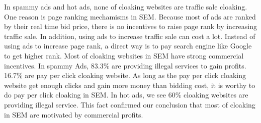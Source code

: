 In spammy ads and hot ads, none of cloaking websites are traffic sale cloaking. 
One reason is page ranking mechamisms in SEM.
Because most of ads are ranked by their real time bid price,
there is no incentives to raise page rank by increasing traffic sale.
In addition, using ads to increase traffic sale can cost a lot.
Instead of using ads to increase page rank, a direct way
is to pay search engine like Google to get higher rank. 
Most of cloaking websites in SEM have strong commercial incentives. In spammy Ads,
83.3\% are providing illegal services to gain profits. 
16.7\% are pay per click cloaking website. As long as the pay per click cloaking 
website get enough clicks and gain more money than bidding cost,
it is worthy to do pay per click cloaking in SEM. In hot ads, we see 60\%
cloaking websites are providing illegal service.
This fact confirmed our conclusion that most of cloaking in
SEM are motivated by commercial profits.


%


